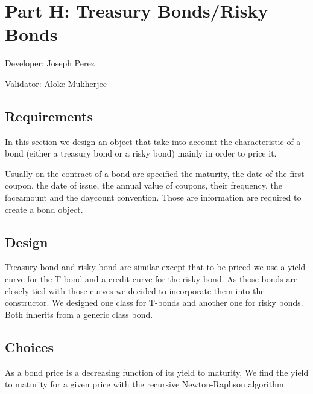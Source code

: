 \chapter{Part H: Treasury Bonds/Risky Bonds}
Developer: Joseph Perez

\noindent Validator: Aloke Mukherjee



\section{Requirements}
In this section we design an object that take into account the characteristic of a bond (either a treasury bond or a risky bond) mainly in order to price it.

Usually on the contract of a bond are specified the maturity, the date of the first coupon, the date of issue, the annual value of coupons, their frequency, the faceamount and the daycount convention. Those are information are required to create a bond object.




\section{Design }
Treasury bond and risky bond are similar except that to be priced we use a yield curve for the T-bond and a credit curve for the risky bond. As those bonds are closely tied with those curves we decided to incorporate them into the constructor.
We designed one class for T-bonds and another one for risky bonds. Both inherits from a generic class bond.

\section{Choices}
As a bond price is a decreasing function of its yield to maturity, We find the yield to maturity for a given price with the recursive Newton-Raphson algorithm.

